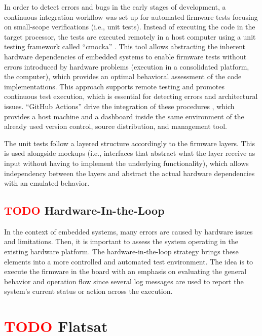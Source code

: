 In order to detect errors and bugs in the early stages of development, a continuous integration workflow was set up for automated firmware tests focusing on small-scope verifications (i.e., unit tests). Instead of executing the code in the target processor, the tests are executed remotely in a host computer using a unit testing framework called ``cmocka'' \cite{cmocka}. This tool allows abstracting the inherent hardware dependencies of embedded systems to enable firmware tests without errors introduced by hardware problems (execution in a consolidated platform, the computer), which provides an optimal behavioral assessment of the code implementations. This approach supports remote testing and promotes continuous test execution, which is essential for detecting errors and architectural issues. ``GitHub Actions'' drive the integration of these procedures \cite{gh-actions}, which provides a host machine and a dashboard inside the same environment of the already used version control, source distribution, and management tool.

The unit tests follow a layered structure accordingly to the firmware layers. This is used alongside mockups (i.e., interfaces that abstract what the layer receive as input without having to implement the underlying functionality), which allows independency between the layers and abstract the actual hardware dependencies with an emulated behavior.

\subsection{ \textcolor{red}{TODO} Hardware-In-the-Loop}

In the context of embedded systems, many errors are caused by hardware issues and limitations. Then, it is important to assess the system operating in the existing hardware platform. The hardware-in-the-loop strategy brings these elements into a more controlled and automated test environment. The idea is to execute the firmware in the board with an emphasis on evaluating the general behavior and operation flow since several log messages are used to report the system's current status or action across the execution.


\section{ \textcolor{red}{TODO} Flatsat}

